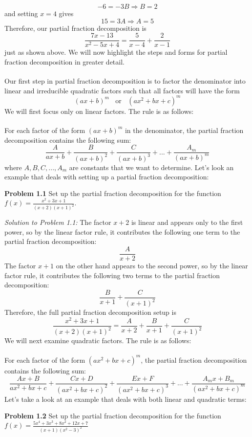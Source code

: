\documentclass[11pt]{scrartcl}
\begin{document}
$$-6=-3B \Rightarrow B=2$$
and setting $x=4$ gives 
$$15=3A \Rightarrow A=5$$
Therefore, our partial fraction decomposition is 
$$\frac{7x-13}{x^2-5x+4}=\frac{5}{x-4}+\frac{2}{x-1}$$
just as shown above. We will now highlight the steps and forms for partial fraction decomposition in greater detail. \\
\\
\noindent 
Our first step in partial fraction decomposition is to factor the denominator into linear and irreducible quadratic factors such that all factors will have the form 
$$(ax+b)^m \ \ \ \ \text{or} \ \ \ \ (ax^2+bx+c)^m$$
We will first focus only on linear factors. The rule is as follows: \\
\\
\noindent 
For each factor of the form $(ax+b)^m$ in the denominator, the partial fraction decomposition contains the following sum: 
$$\frac{A}{ax+b}+\frac{B}{(ax+b)^2}+\frac{C}{(ax+b)^3}+...+\frac{A_m}{(ax+b)^m}$$
where $A,B,C,...,A_m$ are constants that we want to determine. Let's look an example that deals with setting up a partial fraction decomposition:
\begin{tcolorbox}
[colback=purple!5!white,colframe=purple!75!black]
\textbf{Problem 1.1} Set up the partial fraction decomposition for the function $f(x)=\frac{x^2+3x+1}{(x+2)(x+1)^2}$.
\end{tcolorbox}
\noindent
\textit{Solution to Problem 1.1:} The factor $x+2$ is linear and appears only to the first power, so by the linear factor rule, it contributes the following one term to the partial fraction decomposition: 
$$\frac{A}{x+2}$$
The factor $x+1$ on the other hand appears to the second power, so by the linear factor rule, it contributes the following two terms to the partial fraction decomposition: 
$$\frac{B}{x+1}+\frac{C}{(x+1)^2}$$
Therefore, the full partial fraction decomposition setup is 
$$\frac{x^2+3x+1}{(x+2)(x+1)^2}=\frac{A}{x+2}+\frac{B}{x+1}+\frac{C}{(x+1)^2}$$
\noindent 
We will next examine quadratic factors. The rule is as follows: \\
\\
\noindent 
For each factor of the form $(ax^2+bx+c)^m$, the partial fraction decomposition contains the following sum: 
$$\frac{Ax+B}{ax^2+bx+c}+\frac{Cx+D}{(ax^2+bx+c)^2}+\frac{Ex+F}{(ax^2+bx+c)^3}+...+\frac{A_mx+B_m}{(ax^2+bx+c)^m}$$
Let's take a look at an example that deals with both linear and quadratic terms: 
\begin{tcolorbox}
[colback=purple!5!white,colframe=purple!75!black]
\textbf{Problem 1.2} Set up the partial fraction decomposition for the function $f(x)=\frac{5x^4+3x^3+8x^2+12x+7}{(x+1)(x^2-3)^2}$
\end{tcolorbox}
\end{document}
